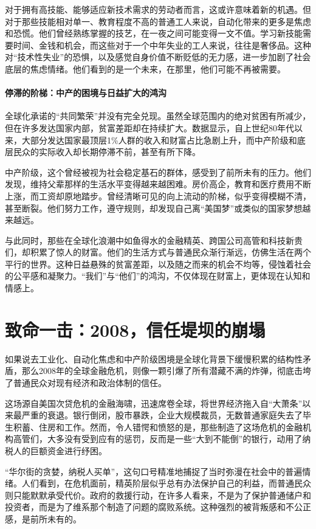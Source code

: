对于拥有高技能、能够适应新技术需求的劳动者而言，这或许意味着新的机遇。但对于那些技能相对单一、教育程度不高的普通工人来说，自动化带来的更多是焦虑和恐慌。他们曾经熟练掌握的技艺，在一夜之间可能变得一文不值。学习新技能需要时间、金钱和机会，而这些对于一个中年失业的工人来说，往往是奢侈品。这种对“技术性失业”的恐惧，以及感觉自身价值不断贬低的无力感，进一步加剧了社会底层的焦虑情绪。他们看到的是一个未来，在那里，他们可能不再被需要。

\paragraph*{停滞的阶梯：中产的困境与日益扩大的鸿沟}

全球化承诺的“共同繁荣”并没有完全兑现。虽然全球范围内的绝对贫困有所减少，但在许多发达国家内部，贫富差距却在持续扩大。数据显示，自上世纪80年代以来，大部分发达国家最顶层1\%人群的收入和财富占比急剧上升，而中产阶级和底层民众的实际收入却长期停滞不前，甚至有所下降。

中产阶级，这个曾经被视为社会稳定基石的群体，感受到了前所未有的压力。他们发现，维持父辈那样的生活水平变得越来越困难。房价高企，教育和医疗费用不断上涨，而工资却原地踏步。曾经清晰可见的向上流动的阶梯，似乎变得模糊不清，甚至断裂。他们努力工作，遵守规则，却发现自己离“美国梦”或类似的国家梦想越来越远。

与此同时，那些在全球化浪潮中如鱼得水的金融精英、跨国公司高管和科技新贵们，却积累了惊人的财富。他们的生活方式与普通民众渐行渐远，仿佛生活在两个平行的世界。这种日益悬殊的贫富差距，以及随之而来的机会不均等，侵蚀着社会的公平感和凝聚力。“我们”与“他们”的鸿沟，不仅体现在财富上，更体现在认知和情感上。

\section{致命一击：2008，信任堤坝的崩塌}

如果说去工业化、自动化焦虑和中产阶级困境是全球化背景下缓慢积累的结构性矛盾，那么2008年的全球金融危机，则像一颗引爆了所有潜藏不满的炸弹，彻底击垮了普通民众对现有经济和政治体制的信任。

这场源自美国次贷危机的金融海啸，迅速席卷全球，将世界经济拖入自“大萧条”以来最严重的衰退。银行倒闭，股市暴跌，企业大规模裁员，无数普通家庭失去了毕生积蓄、住房和工作。然而，令人错愕和愤怒的是，那些制造了这场危机的金融机构高管们，大多没有受到应有的惩罚，反而是一些“大到不能倒”的银行，动用了纳税人的巨额资金进行纾困。

“华尔街的贪婪，纳税人买单”，这句口号精准地捕捉了当时弥漫在社会中的普遍情绪。人们看到，在危机面前，精英阶层似乎总有办法保护自己的利益，而普通民众则只能默默承受代价。政府的救援行动，在许多人看来，不是为了保护普通储户和投资者，而是为了维系那个制造了问题的腐败系统。这种强烈的被背叛感和不公正感，是前所未有的。

